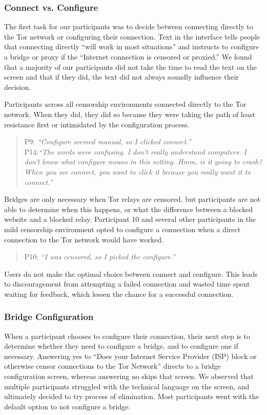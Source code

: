 \documentclass[USenglish,oneside,twocolumn]{article}
\begin{document}
\subsubsection{Connect vs. Configure} 
The first task for our participants was to decide between connecting directly to the Tor network or configuring their connection. Text in the interface tells people that connecting directly ``will work in most situations'' and instructs to configure a bridge or proxy if the ``Internet connection is censored or proxied.'' We found that a majority of our participants did not take the time to read the text on the screen and that if they did, the text did not always soundly influence their decision.

Participants across all censorship environments connected directly to the Tor network. When they did, they did so because they were taking the path of least resistance first or intimidated by the configuration process. 
\begin{quotation}
\noindent P9: \textit{``Configure seemed manual, so I clicked connect.''}\\

\noindent P14:\textit{``The words were confusing. I don't really understand computers. I don't know what configure means in this setting. Hmm, is it going to crash? When you see connect, you want to click it because you really want it to connect.''} 
\end{quotation}

Bridges are only necessary when Tor relays are censored, but participants are not able to determine when this happens, or what the difference between a blocked website and a blocked relay. Participant 10 and several other participants in the mild censorship environment opted to configure a connection when a direct connection to the Tor network would have worked. 

\begin{quotation}
\noindent P10: \textit{``I was censored, so I picked the configure.''}
\end{quotation}

Users do not make the optimal choice between connect and configure. This leads to discouragement from attempting a failed connection and wasted time spent waiting for feedback, which lessen the chance for a successful connection. 

\subsubsection{Bridge Configuration} 
When a participant chooses to configure their connection, their next step is to determine whether they need to configure a bridge, and to configure one if necessary. Answering yes to ``Does your Internet Service Provider (ISP) block or otherwise censor connections to the Tor Network'' directs to a bridge configuration screen, whereas answering no skips that screen. We observed that multiple participants struggled with the technical language on the screen, and ultimately decided to try process of elimination. Most participants went with the default option to not configure a bridge. 
\end{document}
